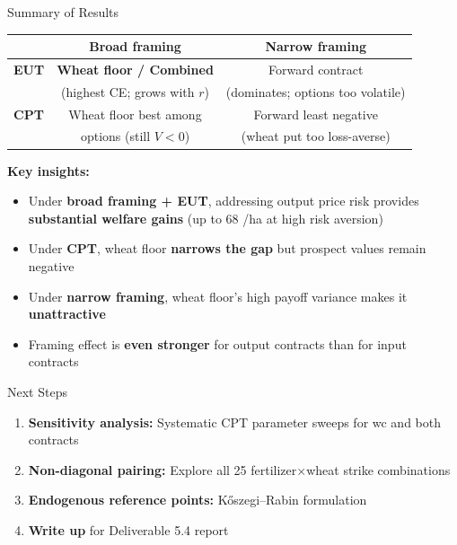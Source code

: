 \documentclass[aspectratio=169,12pt]{beamer}
\newcommand{\eur}{\texteuro}
\newcommand{\best}[1]{\textcolor{best}{\textbf{#1}}}
\begin{document}
\begin{frame}{Summary of Results}
\begin{table}
\centering
\begin{tabular}{lcc}
\toprule
 & \textbf{Broad framing} & \textbf{Narrow framing} \\
\midrule
\textbf{EUT} & \best{Wheat floor / Combined} & Forward contract \\
 & (highest CE; grows with $r$) & (dominates; options too volatile) \\
\midrule
\textbf{CPT} & Wheat floor best among & Forward least negative \\
 & options (still $V < 0$) & (wheat put too loss-averse) \\
\bottomrule
\end{tabular}
\end{table}

\vspace{0.5em}
\textbf{Key insights:}
\begin{itemize}
    \item Under \textbf{broad framing + EUT}, addressing output price risk provides \textbf{substantial welfare gains} (up to 68 \eur/ha at high risk aversion)
    \item Under \textbf{CPT}, wheat floor \textbf{narrows the gap} but prospect values remain negative
    \item Under \textbf{narrow framing}, wheat floor's high payoff variance makes it \textbf{unattractive}
    \item Framing effect is \textbf{even stronger} for output contracts than for input contracts
\end{itemize}
\end{frame}

\begin{frame}{Next Steps}
\begin{enumerate}
    \item \textbf{Sensitivity analysis:} Systematic CPT parameter sweeps for wc and both contracts
    \item \textbf{Non-diagonal pairing:} Explore all 25 fertilizer$\times$wheat strike combinations
    \item \textbf{Endogenous reference points:} K\H{o}szegi--Rabin formulation
    \item \textbf{Write up} for Deliverable 5.4 report
\end{enumerate}
\end{frame}
\end{document}
